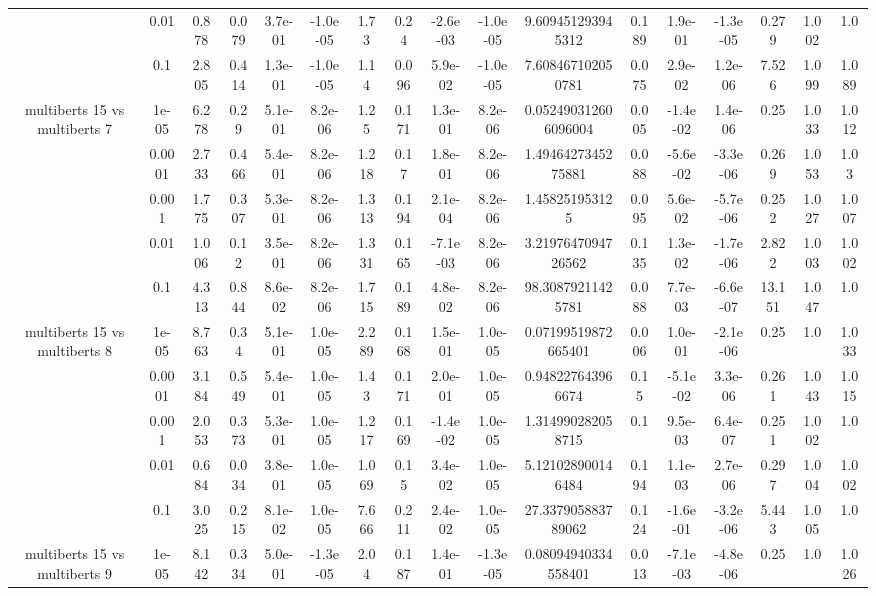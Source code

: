 \begin{tabular}{|c|c|c|c|c|c|c|c|c|c|c|c|c|c|c|c|c|}
 & 0.01 & 0.878 & 0.079 & 3.7e-01 & -1.0e-05 & 1.73 & 0.24 & -2.6e-03 & -1.0e-05 & 9.609451293945312 & 0.189 & 1.9e-01 & -1.3e-05 & 0.279 & 1.002 & 1.0 \\
 & 0.1 & 2.805 & 0.414 & 1.3e-01 & -1.0e-05 & 1.14 & 0.096 & 5.9e-02 & -1.0e-05 & 7.608467102050781 & 0.075 & 2.9e-02 & 1.2e-06 & 7.526 & 1.099 & 1.089 \\
\hline
\multirow{5}{*}{multiberts 15 vs multiberts 7} & 1e-05 & 6.278 & 0.29 & 5.1e-01 & 8.2e-06 & 1.25 & 0.171 & 1.3e-01 & 8.2e-06 & 0.052490312606096004 & 0.005 & -1.4e-02 & 1.4e-06 & 0.25 & 1.033 & 1.012 \\
 & 0.0001 & 2.733 & 0.466 & 5.4e-01 & 8.2e-06 & 1.218 & 0.17 & 1.8e-01 & 8.2e-06 & 1.4946427345275881 & 0.088 & -5.6e-02 & -3.3e-06 & 0.269 & 1.053 & 1.03 \\
 & 0.001 & 1.775 & 0.307 & 5.3e-01 & 8.2e-06 & 1.313 & 0.194 & 2.1e-04 & 8.2e-06 & 1.458251953125 & 0.095 & 5.6e-02 & -5.7e-06 & 0.252 & 1.027 & 1.007 \\
 & 0.01 & 1.006 & 0.12 & 3.5e-01 & 8.2e-06 & 1.331 & 0.165 & -7.1e-03 & 8.2e-06 & 3.2197647094726562 & 0.135 & 1.3e-02 & -1.7e-06 & 2.822 & 1.003 & 1.002 \\
 & 0.1 & 4.313 & 0.844 & 8.6e-02 & 8.2e-06 & 1.715 & 0.189 & 4.8e-02 & 8.2e-06 & 98.30879211425781 & 0.088 & 7.7e-03 & -6.6e-07 & 13.151 & 1.047 & 1.0 \\
\hline
\multirow{5}{*}{multiberts 15 vs multiberts 8} & 1e-05 & 8.763 & 0.34 & 5.1e-01 & 1.0e-05 & 2.289 & 0.168 & 1.5e-01 & 1.0e-05 & 0.07199519872665401 & 0.006 & 1.0e-01 & -2.1e-06 & 0.25 & 1.0 & 1.033 \\
 & 0.0001 & 3.184 & 0.549 & 5.4e-01 & 1.0e-05 & 1.43 & 0.171 & 2.0e-01 & 1.0e-05 & 0.948227643966674 & 0.15 & -5.1e-02 & 3.3e-06 & 0.261 & 1.043 & 1.015 \\
 & 0.001 & 2.053 & 0.373 & 5.3e-01 & 1.0e-05 & 1.217 & 0.169 & -1.4e-02 & 1.0e-05 & 1.314990282058715 & 0.1 & 9.5e-03 & 6.4e-07 & 0.251 & 1.002 & 1.0 \\
 & 0.01 & 0.684 & 0.034 & 3.8e-01 & 1.0e-05 & 1.069 & 0.15 & 3.4e-02 & 1.0e-05 & 5.121028900146484 & 0.194 & 1.1e-03 & 2.7e-06 & 0.297 & 1.004 & 1.002 \\
 & 0.1 & 3.025 & 0.215 & 8.1e-02 & 1.0e-05 & 7.666 & 0.211 & 2.4e-02 & 1.0e-05 & 27.337905883789062 & 0.124 & -1.6e-01 & -3.2e-06 & 5.443 & 1.005 & 1.0 \\
\hline
\multirow{5}{*}{multiberts 15 vs multiberts 9} & 1e-05 & 8.142 & 0.334 & 5.0e-01 & -1.3e-05 & 2.04 & 0.187 & 1.4e-01 & -1.3e-05 & 0.08094940334558401 & 0.013 & -7.1e-03 & -4.8e-06 & 0.25 & 1.0 & 1.026 \\

\end{tabular}
